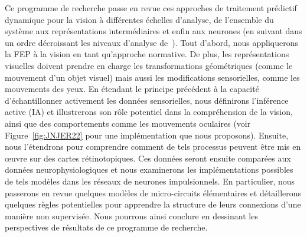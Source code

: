 Ce programme de recherche passe en revue ces approches de traitement prédictif
dynamique pour la vision à différentes échelles d'analyse, de l'ensemble
du système aux représentations intermédiaires et enfin aux neurones (en
suivant dans un ordre décroissant les niveaux d'analyse de~\citet{Marr83}).
Tout d'abord, nous appliquerons la FEP à la vision en tant qu'approche
normative. De plus, les représentations visuelles doivent prendre en
charge les transformations géométriques (comme le mouvement d'un objet
visuel) mais aussi les modifications sensorielles, comme les mouvements
des yeux. En étendant le principe précédent à la capacité
d'échantillonner activement les données sensorielles, nous définirons
l'inférence active (IA) et illustrerons son rôle potentiel dans la
compréhension de la vision, ainsi que des comportements comme les
mouvements oculaires  (voir Figure~\ref{fig:JNJER22} pour une implémentation que nous proposons). Ensuite, nous l'étendrons pour
comprendre comment de tels processus peuvent être mis en œuvre sur des
cartes rétinotopiques. %
Ces données seront ensuite comparées aux données
neurophysiologiques et nous examinerons les implémentations
possibles de tels modèles dans les réseaux de neurones impulsionnels. En particulier, nous passerons en revue quelques modèles de
micro-circuits élémentaires et détaillerons quelques règles potentielles
pour apprendre la structure de leurs connexions d'une manière non
supervisée. Nous pourrons ainsi conclure en dessinant les perspectives de résultats de ce programme de recherche.
%
